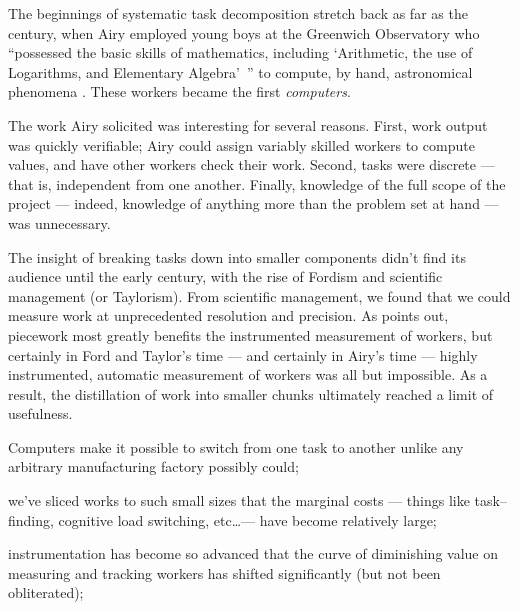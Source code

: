 \documentclass[trackingWork]{subfiles}
\begin{document}
\subsubsubsection{\pieceworkpers}
The beginnings of
systematic task decomposition
stretch back as far as the  century,
when Airy employed young boys at the Greenwich Observatory who
``possessed the basic skills of mathematics, including
`Arithmetic, the use of Logarithms, and Elementary Algebra'~''
to compute, by hand, astronomical phenomena
\cite{grier2013computers}.
These workers became the first \textit{computers}.

The work Airy solicited was interesting for several reasons.
First, work output was quickly verifiable;
Airy could assign variably skilled workers to compute values,
and have other workers check their work.
Second, tasks were discrete --- that is, independent from one another.
Finally, knowledge of the full scope of the project
--- indeed, knowledge of anything more than the problem set at hand ---
was unnecessary.

The insight of breaking tasks down into smaller components didn't find its audience until
the early  century,
with the rise of Fordism and scientific management (or Taylorism).
From scientific management, we found that
we could measure work at unprecedented resolution and precision.
As \citeauthor{Brown01041990} points out,
piecework most greatly benefits the instrumented measurement of workers, but certainly
in Ford and Taylor's time --- and certainly in Airy's time ---
highly instrumented, automatic measurement of workers was all but impossible.
As a result,
the distillation of work into smaller chunks
ultimately reached a limit of usefulness.



\subsubsubsection{\whatchanged}
\begin{inlinelist}
  \item Computers make it possible to switch from one task to another
  unlike any arbitrary manufacturing factory possibly could;
  \item we've sliced works to such small sizes that the marginal costs
  --- things like task--finding, cognitive load switching, etc\dots ---
  have become relatively large;
  \item instrumentation has become so advanced that
  the curve of diminishing value on measuring and tracking workers has shifted significantly
  (but not been obliterated);
\end{inlinelist}
\end{document}
